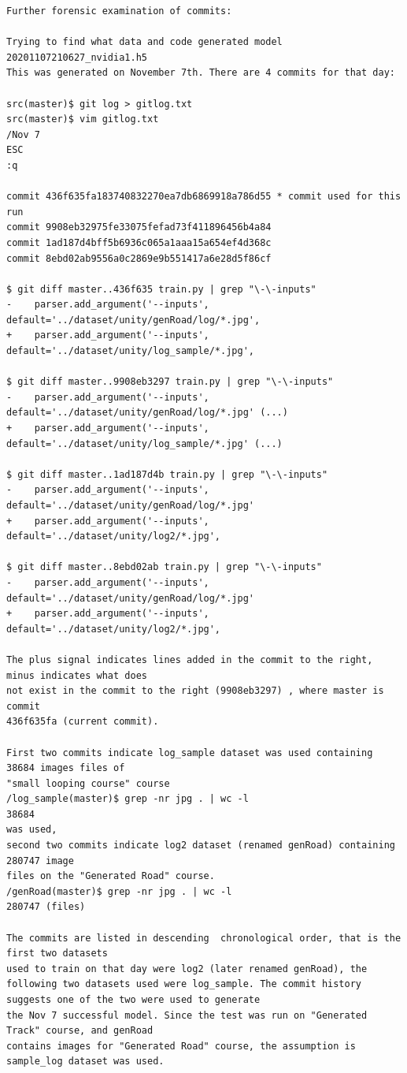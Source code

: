 \begin{verbatim}
Further forensic examination of commits:

Trying to find what data and code generated model 20201107210627_nvidia1.h5
This was generated on November 7th. There are 4 commits for that day:

src(master)$ git log > gitlog.txt
src(master)$ vim gitlog.txt 
/Nov 7
ESC
:q

commit 436f635fa183740832270ea7db6869918a786d55 * commit used for this run
commit 9908eb32975fe33075fefad73f411896456b4a84 
commit 1ad187d4bff5b6936c065a1aaa15a654ef4d368c
commit 8ebd02ab9556a0c2869e9b551417a6e28d5f86cf

$ git diff master..436f635 train.py | grep "\-\-inputs"
-    parser.add_argument('--inputs', default='../dataset/unity/genRoad/log/*.jpg',
+    parser.add_argument('--inputs', default='../dataset/unity/log_sample/*.jpg', 

$ git diff master..9908eb3297 train.py | grep "\-\-inputs"
-    parser.add_argument('--inputs', default='../dataset/unity/genRoad/log/*.jpg' (...)
+    parser.add_argument('--inputs', default='../dataset/unity/log_sample/*.jpg' (...)

$ git diff master..1ad187d4b train.py | grep "\-\-inputs"
-    parser.add_argument('--inputs', default='../dataset/unity/genRoad/log/*.jpg'
+    parser.add_argument('--inputs', default='../dataset/unity/log2/*.jpg', 

$ git diff master..8ebd02ab train.py | grep "\-\-inputs"
-    parser.add_argument('--inputs', default='../dataset/unity/genRoad/log/*.jpg'
+    parser.add_argument('--inputs', default='../dataset/unity/log2/*.jpg',

The plus signal indicates lines added in the commit to the right, minus indicates what does
not exist in the commit to the right (9908eb3297) , where master is commit
436f635fa (current commit).

First two commits indicate log_sample dataset was used containing 38684 images files of
"small looping course" course
/log_sample(master)$ grep -nr jpg . | wc -l
38684
was used, 
second two commits indicate log2 dataset (renamed genRoad) containing 280747 image 
files on the "Generated Road" course.
/genRoad(master)$ grep -nr jpg . | wc -l
280747 (files)

The commits are listed in descending  chronological order, that is the first two datasets 
used to train on that day were log2 (later renamed genRoad), the following two datasets used were log_sample. The commit history suggests one of the two were used to generate
the Nov 7 successful model. Since the test was run on "Generated Track" course, and genRoad
contains images for "Generated Road" course, the assumption is sample_log dataset was used.


\end{verbatim}
